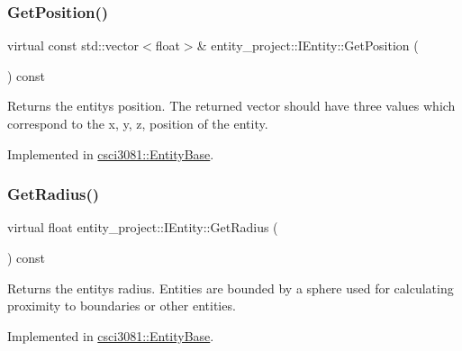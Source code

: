 \mbox{\label{classentity__project_1_1IEntity_a1369c59d258645a12a06239ece1134cf}} 
\subsubsection{\texorpdfstring{Get\+Position()}{GetPosition()}}
{\footnotesize\ttfamily virtual const std\+::vector$<$float$>$\& entity\+\_\+project\+::\+I\+Entity\+::\+Get\+Position (\begin{DoxyParamCaption}{ }\end{DoxyParamCaption}) const\hspace{0.3cm}{\ttfamily [pure virtual]}}

Returns the entity\textquotesingle{}s position. The returned vector should have three values which correspond to the x, y, z, position of the entity. 

Implemented in \hyperlink{classcsci3081_1_1EntityBase_a05830db8b41c0a9c05eec08f95f683ad}{csci3081\+::\+Entity\+Base}.

\mbox{\label{classentity__project_1_1IEntity_af2c2f81a5d201c4c1968f055808ba59c}} 
\subsubsection{\texorpdfstring{Get\+Radius()}{GetRadius()}}
{\footnotesize\ttfamily virtual float entity\+\_\+project\+::\+I\+Entity\+::\+Get\+Radius (\begin{DoxyParamCaption}{ }\end{DoxyParamCaption}) const\hspace{0.3cm}{\ttfamily [pure virtual]}}

Returns the entity\textquotesingle{}s radius. Entities are bounded by a sphere used for calculating proximity to boundaries or other entities. 

Implemented in \hyperlink{classcsci3081_1_1EntityBase_abf61eb1cc8b94a7756f0ebc6a0c8a8f3}{csci3081\+::\+Entity\+Base}.

